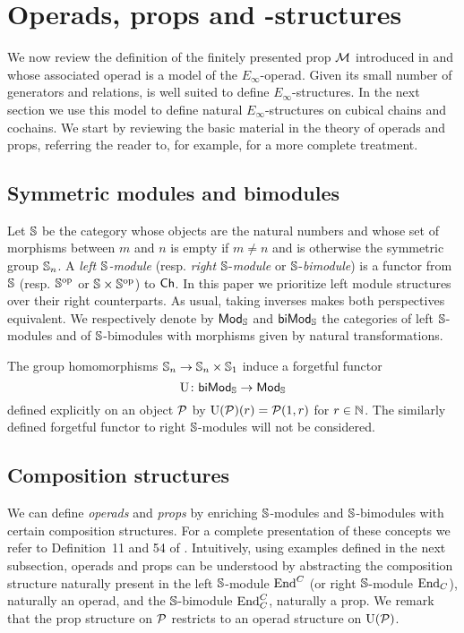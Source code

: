 
\section{Operads, props and \pdfEinfty-structures} \label{s:operads and props}

We now review the definition of the finitely presented prop $\M$ introduced in \cite{medina2020prop1} and whose associated operad is a model of the $E_\infty$-operad.
Given its small number of generators and relations, is well suited to define $E_\infty$-structures.
In the next section we use this model to define natural $E_\infty$-structures on cubical chains and cochains.
We start by reviewing the basic material in the theory of operads and props, referring the reader to, for example, \cite{markl2008props} for a more complete treatment.

\subsection{Symmetric modules and bimodules}

Let $\S$ be the category whose objects are the natural numbers and whose set of morphisms between $m$ and $n$ is empty if $m \neq n$ and is otherwise the symmetric group $\S_n$.
A \textit{left $\S$-module} (resp. \textit{right} $\S$-\textit{module} or $\S$-\textit{bimodule}) is a functor from $\S$ (resp. $\S^\op$ or $\S \times \S^\op$) to $\Ch$.
In this paper we prioritize left module structures over their right counterparts.
As usual, taking inverses makes both perspectives equivalent.
We respectively denote by $\Smod$ and $\Sbimod$ the categories of left $\S$-modules and of $\S$-bimodules with morphisms given by natural transformations.

The group homomorphisms $\S_n \to \S_n \times \S_1$ induce a forgetful functor \[
\forget \colon \Sbimod \to \Smod
\]
defined explicitly on an object $\cP$ by $\forget(\cP)(r) = \cP(1, r)$ for $r \in \N$.
The similarly defined forgetful functor to right $\S$-modules will not be considered.

\subsection{Composition structures}

We can define \textit{operads} and \textit{props} by enriching $\S$-modules and $\S$-bimodules with certain composition structures.
For a complete presentation of these concepts we refer to Definition~11 and 54 of \cite{markl2008props}.
Intuitively, using examples defined in the next subsection, operads and props can be understood by abstracting the composition structure naturally present in the left $\S$-module $\End^C$ (or right $\S$-module $\End_C$), naturally an operad, and the $\S$-bimodule $\End^C_C$, naturally a prop.
We remark that the prop structure on $\cP$ restricts to an operad structure on $\forget(\cP)$.


